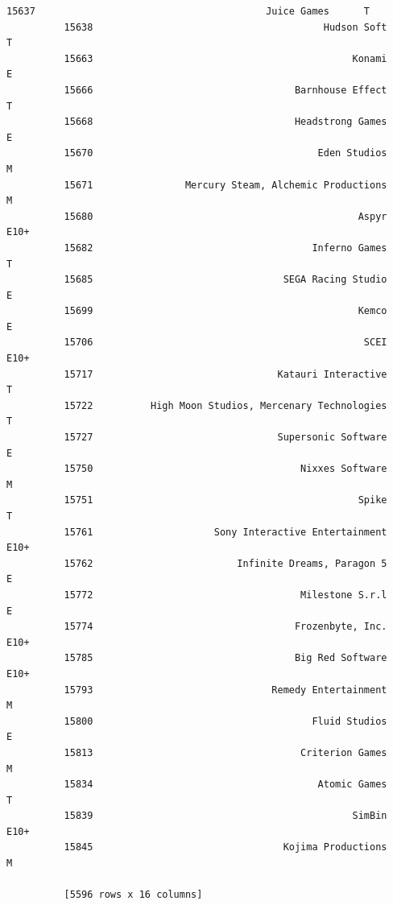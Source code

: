 \documentclass[11pt]{article}
\begin{document}
\begin{Verbatim}[commandchars=\\\{\}]
          15637                                        Juice Games      T  
          15638                                        Hudson Soft      T  
          15663                                             Konami      E  
          15666                                   Barnhouse Effect      T  
          15668                                   Headstrong Games      E  
          15670                                       Eden Studios      M  
          15671                Mercury Steam, Alchemic Productions      M  
          15680                                              Aspyr   E10+  
          15682                                      Inferno Games      T  
          15685                                 SEGA Racing Studio      E  
          15699                                              Kemco      E  
          15706                                               SCEI   E10+  
          15717                                Katauri Interactive      T  
          15722          High Moon Studios, Mercenary Technologies      T  
          15727                                Supersonic Software      E  
          15750                                    Nixxes Software      M  
          15751                                              Spike      T  
          15761                     Sony Interactive Entertainment   E10+  
          15762                         Infinite Dreams, Paragon 5      E  
          15772                                    Milestone S.r.l      E  
          15774                                   Frozenbyte, Inc.   E10+  
          15785                                   Big Red Software   E10+  
          15793                               Remedy Entertainment      M  
          15800                                      Fluid Studios      E  
          15813                                    Criterion Games      M  
          15834                                       Atomic Games      T  
          15839                                             SimBin   E10+  
          15845                                 Kojima Productions      M  
          
          [5596 rows x 16 columns]
\end{Verbatim}
            
\end{document}

